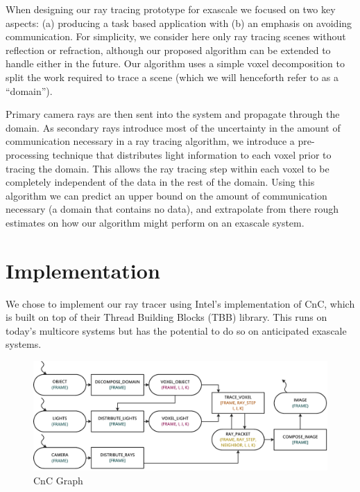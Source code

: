 
When designing our ray tracing prototype for exascale we focused on
two key aspects: (a) producing a task based application with (b) an
emphasis on avoiding communication. For simplicity, we consider here
only ray tracing scenes without reflection or refraction, although our
proposed algorithm can be extended to handle either in the future. Our
algorithm uses a simple voxel decomposition to split the work required
to trace a scene (which we will henceforth refer to as a ``domain'').

Primary camera rays are then sent into the system and propagate
through the domain. As secondary rays introduce most of the uncertainty
in the amount of communication necessary in a ray tracing algorithm,
we introduce a pre-processing technique that distributes light
information to each voxel prior to tracing the domain. This allows the
ray tracing step within each voxel to be completely independent of the
data in the rest of the domain. Using this algorithm we can predict an
upper bound on the amount of communication necessary (a domain that
contains no data), and extrapolate from there rough estimates on how
our algorithm might perform on an exascale system.

\section{Implementation}
\label{sec:implementation}

We chose to implement our ray tracer using Intel’s implementation of
CnC, which is built on top of their Thread Building Blocks (TBB)
library. This runs on today’s multicore systems but has the potential
to do so on anticipated exascale systems.

\begin{figure}[t]
  \centering
  \includegraphics[width=\textwidth]{drawings/CnC.pdf}
  \caption{CnC Graph}
  \label{fig:cnc}
\end{figure}


